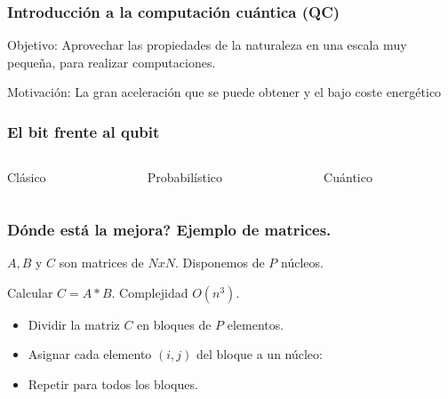 \documentclass{beamer}
\begin{document}
\begin{frame}
\frametitle{Introducción a la computación cuántica (QC)}
Objetivo: Aprovechar las propiedades de la naturaleza en una escala muy pequeña, 
para realizar computaciones.

\pause

Motivación: La gran aceleración que se puede obtener y el bajo coste energético

\end{frame}
\begin{frame}
\frametitle{El bit frente al qubit}

\begin{columns}
	\begin{column}{0.33\textwidth}
		\center
		Clásico
		

	\end{column}
	\begin{column}{0.33\textwidth}
		\center
		Probabilístico
		
	\end{column}
	\begin{column}{0.33\textwidth}
		\center
		Cuántico
		
	\end{column}
\end{columns}

\end{frame}
\begin{frame}
\frametitle{}

\end{frame}



\begin{frame}
\frametitle{Dónde está la mejora? Ejemplo de matrices.}

$A, B$ y $C$ son matrices de $NxN$. Disponemos de $P$ núcleos.

Calcular $C = A * B$. Complejidad $ O(n^3) $.


\begin{itemize}
\item Dividir la matriz $C$ en bloques de $P$ elementos.
\item Asignar cada elemento $(i,j)$ del bloque a un núcleo:
\item Repetir para todos los bloques.
\end{itemize}

\end{frame}
\end{document}
